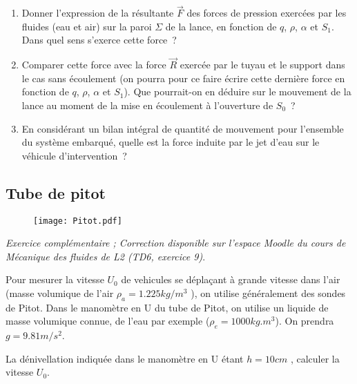 {\begin{enumerate}
et calculer leur valeur dans le r\'egime de fonctionnement d\'ecrit dans
la question pr\'ec\'edente.
\item
Donner l'expression de la r\'esultante $\vec{F}$
des forces de pression exerc\'ees par les fluides (eau et air)
sur la paroi $\Sigma$ de la lance, en fonction de $q$, $\rho$, $\alpha$
et $S_1$.
Dans quel sens s'exerce cette force~?
\item
Comparer cette force avec la force $\vec{R}$ exerc\'ee par le tuyau
et le support dans le cas sans \'ecoulement (on pourra pour ce faire
\'ecrire cette derni\`ere force en fonction de $q$, $\rho$, $\alpha$
et $S_1$).
Que pourrait-on en d\'eduire sur le mouvement de la lance au moment
de la mise en \'ecoulement \`a l'ouverture de $S_0$~?
\item
En consid\'erant un bilan int\'egral de quantit\'e de mouvement pour l'ensemble
du syst\`eme embarqu\'e, quelle est la force induite par le jet d'eau sur
le v\'ehicule d'intervention~? 
\end{enumerate}
}




\subsection{Tube de pitot}


\begin{figure}[htb]
  \begin{center}
      \texttt{[image: Pitot.pdf]}
      \end{center}
      \vspace{-1cm}
\end{figure}

{\em Exercice complémentaire ; Correction disponible sur l'espace Moodle du cours de Mécanique des fluides de L2 (TD6, exercice 9)}.

Pour mesurer la vitesse $U_0$ de vehicules se déplaçant à grande vitesse dans l'air (masse volumique de l’air $\rho_a = 1.225kg/m^3$ ),  on utilise généralement des sondes de Pitot. Dans le manomètre en U du tube de Pitot, on utilise un liquide de masse volumique connue, de l'eau par exemple ($\rho_e = 1000kg.m^3$). On prendra $g = 9.81 m/s^2$.

La dénivellation indiquée dans le manomètre en U étant $h =10 cm$ , calculer la vitesse $U_0$.




